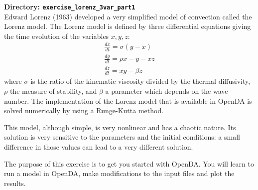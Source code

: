 {\bf Directory: {\tt exercise\_lorenz\_3var\_part1}}\\

Edward Lorenz (1963) developed
a very simplified model of convection called the Lorenz model. The Lorenz model
is defined by three differential equations giving the time evolution of the
variables $x,y,z$:
\begin{eqnarray}
   \frac{dx}{dt}=\sigma(y-x) \\
   \frac{dy}{dt}=\rho x - y -x z \\
   \frac{dz}{dt}=x y - \beta z
\end{eqnarray}
where $\sigma$ is the ratio of the kinematic viscosity divided by the thermal
diffusivity, $\rho$ the measure of stability, and $\beta$ a parameter which
depends on the wave number.
The implementation of the Lorenz model that is available in OpenDA is solved numerically by using a Runge-Kutta method.

This model, although simple, is very nonlinear and has a chaotic nature.  Its
solution is very sensitive to the parameters and the initial conditions: a
small difference in those values can lead to a very different solution.

The purpose of this exercise is to get you started with OpenDA. You will learn
to run a model in OpenDA, make modifications to the input files and plot the
results.

